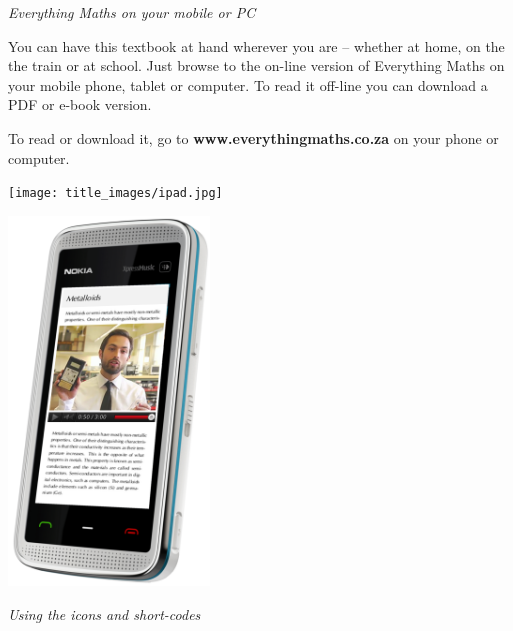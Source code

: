 \newpage
\thispagestyle{empty}

{\normalfont\sffamily\fontsize{22}\normalfont\itshape Everything Maths on your mobile or PC} \par

{
You can have this textbook at hand wherever you are – whether at home, on the the train or at school.
Just browse to the on-line version of Everything Maths on your mobile phone, tablet or computer. To
read it off-line you can download a PDF or e-book version.\par


To read or download it, go to \textbf{www.everythingmaths.co.za} on your phone or computer.} \vspace*{2cm}


\begin{center}
\begin{minipage}{0.4\textwidth}
\centering
\texttt{[image: title\_images/ipad.jpg]}
\end{minipage}
\begin{minipage}{0.4\textwidth}
\centering
\includegraphics[width=0.4\textwidth]{title_images/phone.png}
\end{minipage}
\end{center}

\vspace*{2cm}


{\normalfont\sffamily\fontsize{22}\normalfont\itshape Using the icons and short-codes} \par

